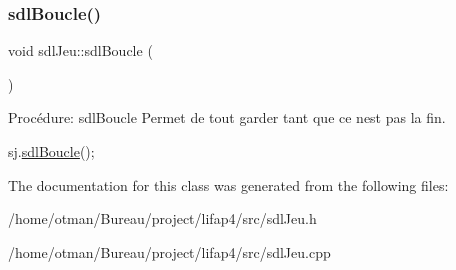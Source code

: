 \subsubsection{\texorpdfstring{sdl\+Boucle()}{sdlBoucle()}}
{\footnotesize\ttfamily void sdl\+Jeu\+::sdl\+Boucle (\begin{DoxyParamCaption}{ }\end{DoxyParamCaption})}



Procédure\+: sdl\+Boucle Permet de tout garder tant que ce n\textquotesingle{}est pas la fin. 


\begin{DoxyCode}
sj.\hyperlink{classsdlJeu_a5628835d7efcab056985c3aa3de56836}{sdlBoucle}();
\end{DoxyCode}
 

The documentation for this class was generated from the following files\+:\begin{DoxyCompactItemize}
\item 
/home/otman/\+Bureau/project/lifap4/src/sdl\+Jeu.\+h\item 
/home/otman/\+Bureau/project/lifap4/src/sdl\+Jeu.\+cpp\end{DoxyCompactItemize}

